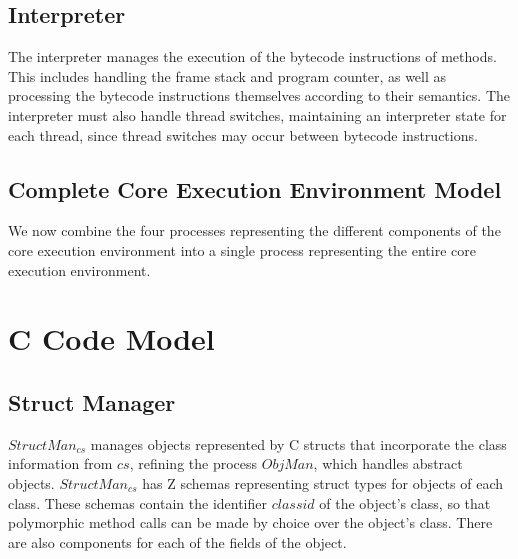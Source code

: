 

\subsection{Interpreter}
\label{cee-interpreter-subsection}

The interpreter manages the execution of the bytecode instructions of
methods.
This includes handling the frame stack and program counter, as well as
processing the bytecode instructions themselves according to their
semantics.
The interpreter must also handle thread switches, maintaining an
interpreter state for each thread, since thread switches may occur
between bytecode instructions.





\subsection{Complete Core Execution Environment Model}
\label{complete-cee-subsection}

We now combine the four \Circus{} processes representing the different
components of the core execution environment into a single \Circus{}
process representing the entire core execution environment.



\section{C Code Model}
\label{cee-c-code-section}

\subsection{Struct Manager}

$StructMan_{cs}$ manages objects represented by C structs that
incorporate the class information from $cs$, refining the process
$ObjMan$, which handles abstract objects.
$StructMan_{cs}$ has Z schemas representing struct types for objects
of each class.
%
%
These schemas contain the identifier $classid$ of the object's class, so
that polymorphic method calls can be made by choice over the object's
class. 
There are also components for each of the fields of the
object.

